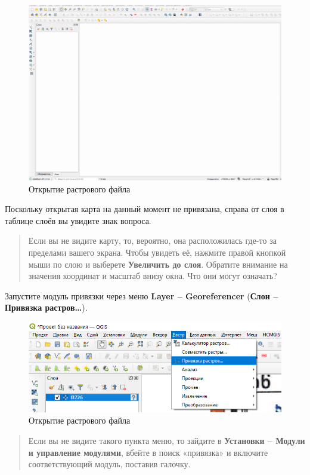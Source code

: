 \documentclass[
  12pt,
]{book}
\begin{document}
\begin{figure}
\centering
\includegraphics{images/Georeference/Open_topomap.gif}
\caption{Открытие растрового файла}
\end{figure}

Поскольку открытая карта на данный момент не привязана, справа от слоя в таблице слоёв вы увидите знак вопроса.

\begin{quote}
Если вы не видите карту, то, вероятно, она расположилась где-то за пределами вашего экрана. Чтобы увидеть её, нажмите правой кнопкой мыши по слою и выберете \textbf{Увеличить до слоя}. Обратите внимание на значения координат и масштаб внизу окна. Что они могут означать?
\end{quote}

Запустите модуль привязки через меню \textbf{Layer -- Georeferencer} (\textbf{Слои -- Привязка растров\ldots{}}).

\begin{figure}
\centering
\includegraphics{images/Georeference/Georeference_raster.png}
\caption{Открытие растрового файла}
\end{figure}

\begin{quote}
Если вы не видите такого пункта меню, то зайдите в \textbf{Установки -- Модули и управление модулями}, вбейте в поиск «привязка» и включите соответствующий модуль, поставив галочку.
\end{quote}
\end{document}
